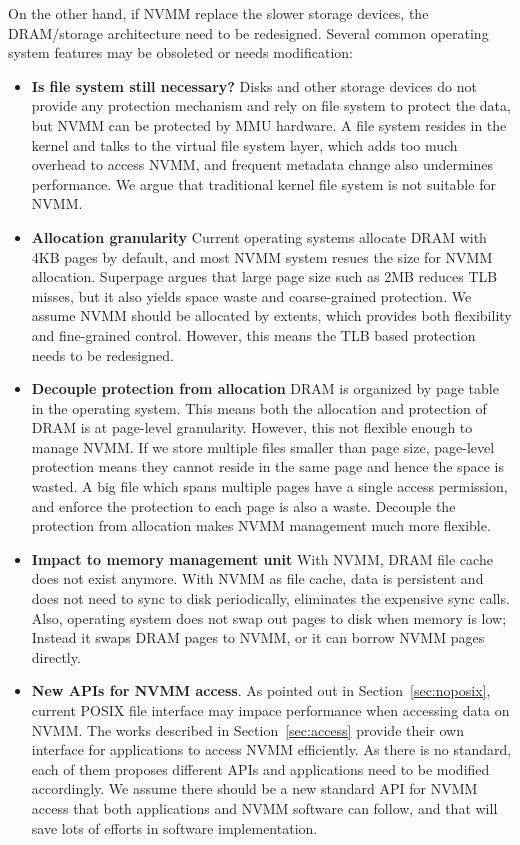 On the other hand, if NVMM replace the slower storage devices, the DRAM/storage
architecture need to be redesigned. Several common operating system features
may be obsoleted or needs modification:
\begin{itemize}
\item \textbf{Is file system still necessary?}
Disks and other storage devices do not provide any
protection mechanism and rely on file system to protect the data, but NVMM
can be protected by MMU hardware. A file system resides in the kernel and
talks to the virtual file system layer, which adds too much overhead to access
NVMM, and frequent metadata change also undermines performance. We argue that
traditional kernel file system is not suitable for NVMM. 
\item \textbf{Allocation granularity}
Current operating systems allocate DRAM with 4KB pages by default,
and most NVMM system resues the size for NVMM allocation. Superpage argues
that large page size such as 2MB reduces TLB misses, but it also yields
space waste and coarse-grained protection. We assume NVMM should be allocated
by extents, which provides both flexibility and fine-grained control. However,
this means the TLB based protection needs to be redesigned.
\item \textbf{Decouple protection from allocation} DRAM is organized by 
page table in the operating system. This means both the allocation and
protection of DRAM is at page-level granularity. However, this not flexible
enough to manage NVMM. If we store multiple files smaller than page size,
page-level protection means they cannot reside in the same page and hence
the space is wasted. A big file which spans multiple pages have a single
access permission, and enforce the protection to each page is also a waste.
Decouple the protection from allocation makes NVMM management much more
 flexible.
\item \textbf{Impact to memory management unit}
With NVMM, DRAM file cache does not exist anymore. With NVMM as file cache,
data is persistent and does not need to sync to disk periodically, eliminates
the expensive sync calls.
Also, operating system does not swap out pages to disk when memory is low;
Instead it swaps DRAM pages to NVMM, or it can borrow NVMM pages directly.
\item \textbf{New APIs for NVMM access}.
As pointed out in Section~\ref{sec:noposix}, current POSIX file 
interface may impace performance when accessing data on NVMM.
The works described in Section~\ref{sec:access} provide their own interface
for applications to access NVMM efficiently. As there is no standard, each of
them proposes different APIs and applications need to be modified accordingly.
We assume there should be a new standard API for NVMM access that both
applications and NVMM software can follow, and that will save lots of efforts
in software implementation. 
\end{itemize}

